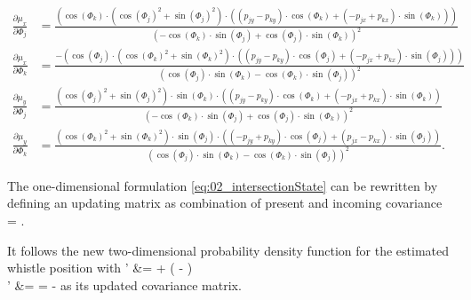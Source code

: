 \begin{align*}
\frac{\partial \mu_x}{\partial \Phi_j} &= \frac{(\cos(\Phi_k) \cdot (\cos(\Phi_j)^2 + \sin(\Phi_j)^2) \cdot ((p_{jy} - p_{ky}) \cdot \cos(\Phi_k) +
                                  (-p_{jx} + p_{kx}) \cdot \sin(\Phi_k)))}
                                  {(-\cos(\Phi_k) \cdot \sin(\Phi_j) + \cos(\Phi_j) \cdot \sin(\Phi_k))^2}
                                  \\
\frac{\partial \mu_x}{\partial \Phi_k} &= \frac{-(\cos(\Phi_j) \cdot (\cos(\Phi_k)^2 + \sin(\Phi_k)^2) \cdot ((p_{jy} - p_{ky}) \cdot \cos(\Phi_j) + (-p_{jx} + p_{kx}) \cdot \sin(\Phi_j)))}
                                {(\cos(\Phi_j) \cdot \sin(\Phi_k) - \cos(\Phi_k) \cdot \sin(\Phi_j))^2}
                                \\
\frac{\partial \mu_y}{\partial \Phi_j} &= \frac{(\cos(\Phi_j)^2 + \sin(\Phi_j)^2) \cdot \sin(\Phi_k) \cdot ((p_{jy} - p_{ky}) \cdot \cos(\Phi_k) + (-p_{jx} + p_{kx}) \cdot \sin(\Phi_k))}
                                {(-\cos(\Phi_k) \cdot \sin(\Phi_j) + \cos(\Phi_j) \cdot \sin(\Phi_k))^2}
                                \\
\frac{\partial \mu_y}{\partial \Phi_k} &= \frac{(\cos(\Phi_k)^2 + \sin(\Phi_k)^2) \cdot \sin(\Phi_j) \cdot ((-p_{jy} + p_{ky}) \cdot \cos(\Phi_j) + (p_{jx} - p_{kx}) \cdot \sin(\Phi_j))}
                                {(\cos(\Phi_j) \cdot \sin(\Phi_k) - \cos(\Phi_k) \cdot \sin(\Phi_j))^2}.
\end{align*}

The one-dimensional formulation \cref{eq:02_intersectionState} can be rewritten by defining
an updating matrix  as combination of present and incoming covariance
\bal
     = .
\eal

It follows the new two-dimensional probability density function for the estimated
whistle position with
\bsub
\bal
    \vec{\mu}' &= \vec{\mu} +  \cdot \left( - \vec{\mu}\right)
    \\
    ' &=  =  -  \cdot {}
\eal
\esub
as its updated covariance matrix.